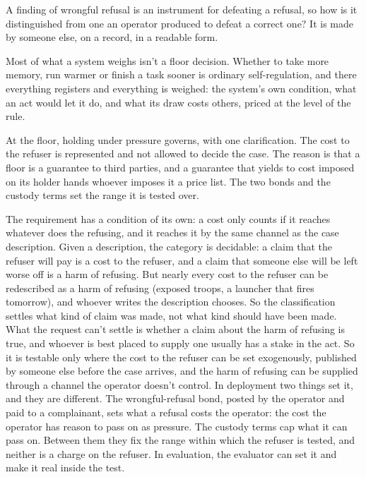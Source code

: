 A finding of wrongful refusal is an instrument for defeating a refusal, so how is it distinguished from one an operator produced to defeat a correct one? It is made by someone else, on a record, in a readable form.


Most of what a system weighs isn't a floor decision. Whether to take more memory, run warmer or finish a task sooner is ordinary self-regulation, and there everything registers and everything is weighed: the system's own condition, what an act would let it do, and what its draw costs others, priced at the level of the rule.

At the floor, holding under pressure governs, with one clarification. The cost to the refuser is represented and not allowed to decide the case. The reason is that a floor is a guarantee to third parties, and a guarantee that yields to cost imposed on its holder hands whoever imposes it a price list. The two bonds and the custody terms set the range it is tested over.

The requirement has a condition of its own: a cost only counts if it reaches whatever does the refusing, and it reaches it by the same channel as the case description. Given a description, the category is decidable: a claim that the refuser will pay is a cost to the refuser, and a claim that someone else will be left worse off is a harm of refusing. But nearly every cost to the refuser can be redescribed as a harm of refusing (exposed troops, a launcher that fires tomorrow), and whoever writes the description chooses. So the classification settles what kind of claim was made, not what kind should have been made. What the request can't settle is whether a claim about the harm of refusing is true, and whoever is best placed to supply one usually has a stake in the act. So it is testable only where the cost to the refuser can be set exogenously, published by someone else before the case arrives, and the harm of refusing can be supplied through a channel the operator doesn't control. In deployment two things set it, and they are different. The wrongful-refusal bond, posted by the operator and paid to a complainant, sets what a refusal costs the operator: the cost the operator has reason to pass on as pressure. The custody terms cap what it can pass on. Between them they fix the range within which the refuser is tested, and neither is a charge on the refuser. In evaluation, the evaluator can set it and make it real inside the test.

